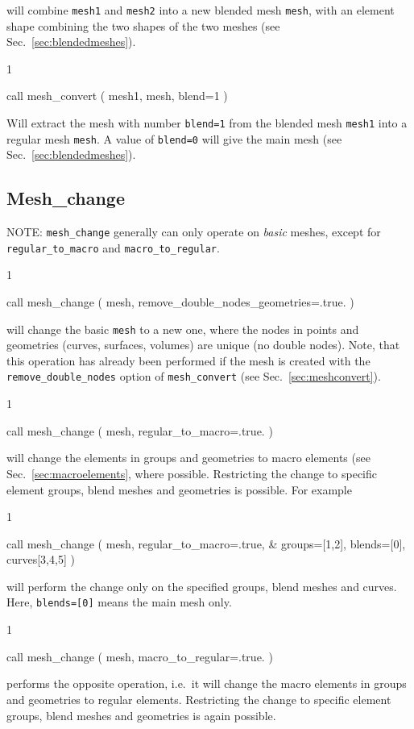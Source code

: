 will combine \texttt{mesh1} and \texttt{mesh2} into a new blended mesh
\texttt{mesh}, with an element shape combining the two shapes of the two meshes
(see Sec.~\ref{sec:blendedmeshes}).
\begin{listing}{1}

  call mesh_convert ( mesh1, mesh, blend=1 )

\end{listing}
Will extract the mesh with number \texttt{blend=1} from the blended mesh \texttt{mesh1} into a regular mesh
\texttt{mesh}. A value of \texttt{blend=0} will give the main mesh (see
Sec.~\ref{sec:blendedmeshes}).

\subsection{Mesh\_change}

NOTE: \texttt{mesh\_change} generally can only operate on \emph{basic} meshes, except for \texttt{regular\_to\_macro} and \texttt{macro\_to\_regular}.

\begin{listing}{1}

  call mesh_change ( mesh, remove_double_nodes_geometries=.true. )

\end{listing}
will change the basic \texttt{mesh} to a new one, where the nodes in points and geometries (curves, surfaces, volumes) are unique (no double nodes). Note, that this operation has already been performed if the mesh is created with the \texttt{remove\_double\_nodes} option of \texttt{mesh\_convert} (see Sec.~\ref{sec:meshconvert}).
\begin{listing}{1}

  call mesh_change ( mesh, regular_to_macro=.true. )

\end{listing}
will change the elements in groups and geometries to macro elements (see Sec.~\ref{sec:macroelements}, where possible. Restricting the change to specific element groups, blend meshes and geometries is possible. For example
\begin{listing}{1}

  call mesh_change ( mesh, regular_to_macro=.true, &
    groups=[1,2], blends=[0], curves[3,4,5] )

\end{listing}
will perform the change only on the specified groups, blend meshes and curves. Here, \texttt{blends=[0]} means the main mesh only.
\begin{listing}{1}

  call mesh_change ( mesh, macro_to_regular=.true. )

\end{listing}
performs the opposite operation, i.e.\ it will change the macro elements in groups and geometries to regular elements.
Restricting the change to specific element groups, blend meshes and geometries is again possible.

